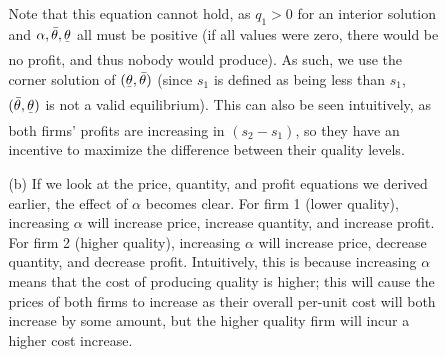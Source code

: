 \documentclass[12pt,letterpaper]{article}
\begin{document}
\begin{enumerate}
\begin{enumerate}
\begin{enumerate}
		Note that this equation cannot hold, as $q_1>0$ for an interior solution and $\alpha, \bar{\theta}, \underset{\bar{}}{\theta}$ all must be positive (if all values were zero, there would be no profit, and thus nobody would produce). As such, we use the corner solution of $(\underset{\bar{}}{\theta}, \bar{\theta})$ (since $s_1$ is defined as being less than $s_1$, $(\bar{\theta}, \underset{\bar{}}{\theta})$ is not a valid equilibrium). This can also be seen intuitively, as both firms' profits are increasing in $(s_2 - s_1)$, so they have an incentive to maximize the difference between their quality levels.
		\item[(b)]
		If we look at the price, quantity, and profit equations we derived earlier, the effect of $\alpha$ becomes clear. For firm 1 (lower quality), increasing $\alpha$ will increase price, increase quantity, and increase profit. For firm 2 (higher quality), increasing $\alpha$ will increase price, decrease quantity, and decrease profit. Intuitively, this is because increasing $\alpha$ means that the cost of producing quality is higher; this will cause the prices of both firms to increase as their overall per-unit cost will both increase by some amount, but the higher quality firm will incur a higher cost increase.
	\end{enumerate} 

\end{enumerate} 


\end{enumerate}
\end{document}
